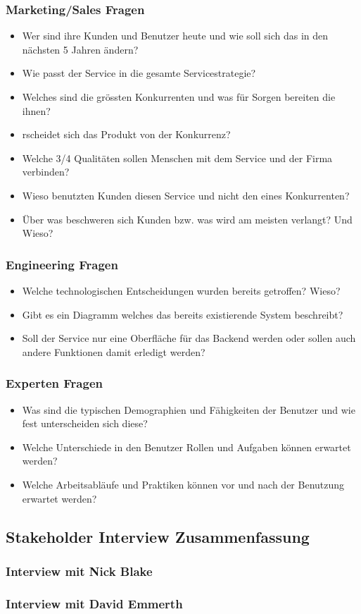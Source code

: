 \subsubsection{Marketing/Sales Fragen}
\begin{itemize}
  \item Wer sind ihre Kunden und Benutzer heute und wie soll sich das in den nächsten 5 Jahren ändern?
  \item Wie passt der Service in die gesamte Servicestrategie?
  \item Welches sind die grössten Konkurrenten und was für Sorgen bereiten die ihnen?
  \item rscheidet sich das Produkt von der Konkurrenz?
  \item Welche 3/4 Qualitäten sollen Menschen mit dem Service und der Firma verbinden?
  \item Wieso benutzten Kunden diesen Service und nicht den eines Konkurrenten?
  \item Über was beschweren sich Kunden bzw. was wird am meisten verlangt? Und Wieso?
\end{itemize}

\subsubsection{Engineering Fragen}
\begin{itemize}
  \item Welche technologischen Entscheidungen wurden bereits getroffen? Wieso?
  \item Gibt es ein Diagramm welches das bereits existierende System beschreibt?
  \item Soll der Service nur eine Oberfläche für das Backend werden oder sollen auch andere Funktionen damit erledigt werden?
\end{itemize}


\subsubsection{Experten Fragen}
\begin{itemize}
  \item Was sind die typischen Demographien und Fähigkeiten der Benutzer und wie fest unterscheiden sich diese?
  \item Welche Unterschiede in den Benutzer Rollen und Aufgaben können erwartet werden?
  \item Welche Arbeitsabläufe und Praktiken können vor und nach der Benutzung erwartet  werden?
\end{itemize}


\subsection{Stakeholder Interview Zusammenfassung}
\label{subsec:interviewzusammen}
\subsubsection{Interview mit Nick Blake}
\subsubsection{Interview mit David Emmerth}